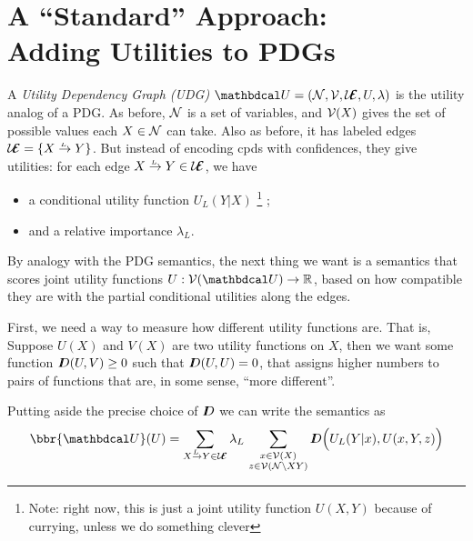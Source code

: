 \documentclass{article}
\newcommand\UEd{\mathcal U\!\!\Ed}
\begin{document}
    \section{A ``Standard'' Approach:\texorpdfstring\\{}
        Adding Utilities to PDGs}
    
    \begin{defn}
        A \emph{Utility Dependency Graph (UDG)}  $\dg U = (\N, \V, \UEd, U, \lambda)$ is the utility analog of a PDG.  As before, $\mathcal N$ is a set of variables, and $\mathcal V(X)$ gives the set of possible values each $X \in \mathcal N$ can take. 
        Also as before, it has labeled edges $\UEd = \{ \ed {L}XY \} $. But instead of encoding cpds with confidences, they give utilities: for each edge $\ed LXY \in \UEd$, we have 
        \begin{itemize}
            \item  a conditional utility function $U_L(Y|X)$%
                \footnote{Note: right now, this is just a joint utility function $U(X,Y)$ because of currying, unless we do something clever}%
            ;
            \item and a relative importance $\lambda_L$.  \qedhere
        \end{itemize}
    \end{defn}

    By analogy with the PDG semantics, the next thing we want is a semantics that scores joint utility functions $U : \V(\dg U) \to \mathbb R$, based on how compatible they are with the partial conditional utilities along the edges. 
    
    First, we need a way to measure how different utility functions are. That is,  Suppose $U(X)$ and $V(X)$ are two utility functions on $X$, then we want some function $I\mkern-8muD(U,V) \ge 0$ such that $I\mkern-8muD(U,U) = 0$, that assigns higher numbers to pairs of functions that are, in some sense, ``more different''.
    
    Putting aside the precise choice of $I\mkern-8muD$ we can write the semantics as 
    \begin{equation}
        \bbr{\dg U}(U) =
             \sum_{\ed LXY \in \UEd} \lambda_L\, \sum_{\substack{x \in \V(X)\\z \in \V(\N\setminus XY)}}
             \thickD\Big( U_L(Y | x),  U(x,Y,z) \Big)
    \end{equation}
\end{document}
